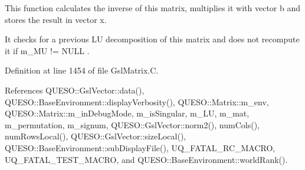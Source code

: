 This function calculates the inverse of {\ttfamily this} matrix, multiplies it with vector {\ttfamily b} and stores the result in vector {\ttfamily x}. 

It checks for a previous L\-U decomposition of {\ttfamily this} matrix and does not recompute it if m\-\_\-\-M\-U != N\-U\-L\-L . 

Definition at line 1454 of file Gsl\-Matrix.\-C.



References Q\-U\-E\-S\-O\-::\-Gsl\-Vector\-::data(), Q\-U\-E\-S\-O\-::\-Base\-Environment\-::display\-Verbosity(), Q\-U\-E\-S\-O\-::\-Matrix\-::m\-\_\-env, Q\-U\-E\-S\-O\-::\-Matrix\-::m\-\_\-in\-Debug\-Mode, m\-\_\-is\-Singular, m\-\_\-\-L\-U, m\-\_\-mat, m\-\_\-permutation, m\-\_\-signum, Q\-U\-E\-S\-O\-::\-Gsl\-Vector\-::norm2(), num\-Cols(), num\-Rows\-Local(), Q\-U\-E\-S\-O\-::\-Gsl\-Vector\-::size\-Local(), Q\-U\-E\-S\-O\-::\-Base\-Environment\-::sub\-Display\-File(), U\-Q\-\_\-\-F\-A\-T\-A\-L\-\_\-\-R\-C\-\_\-\-M\-A\-C\-R\-O, U\-Q\-\_\-\-F\-A\-T\-A\-L\-\_\-\-T\-E\-S\-T\-\_\-\-M\-A\-C\-R\-O, and Q\-U\-E\-S\-O\-::\-Base\-Environment\-::world\-Rank().


